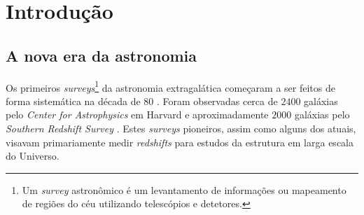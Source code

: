 


\chapter{Introdução}
\label{sec:Intro}


\section{A nova era da astronomia}
\label{sec:Intro:NovaEra}

Os primeiros {\em surveys}\footnote{Um {\em survey} astronômico é um
levantamento de informações ou mapeamento de regiões do céu utilizando
telescópios e detetores.} da astronomia extragalática começaram a ser feitos de
forma sistemática na década de 80 \citep{Huchra1988}. Foram observadas cerca de
$2400$ galáxias pelo {\em Center for Astrophysics} em Harvard \citep{Huchra1983}
e aproximadamente $2000$ galáxias pelo {\em Southern Redshift Survey}
\citep{DaCosta1988}. Estes {\em surveys} pioneiros, assim como alguns dos
atuais, visavam primariamente medir {\em redshifts} para estudos da estrutura em
larga escala do Universo.

